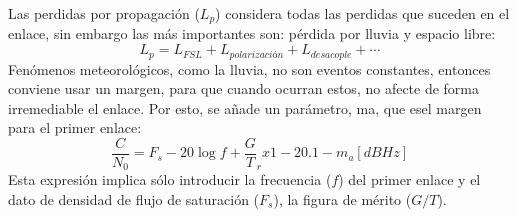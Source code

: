 \documentclass[
	12pt, %
	fleqn, %
	a4paper, %
	oneside, %
]{LegrandOrangeBook}
\begin{document}
Las perdidas por propagación ($L_p$) considera todas las perdidas que suceden en el enlace, sin embargo las más importantes son: pérdida por lluvia y espacio libre:
\begin{equation}
L_p=L_{FSL}+L_{polarización}+L_{desacople}+\cdots
\end{equation}
Fenómenos meteorológicos, como la lluvia, no son eventos constantes, entonces conviene usar un margen, para que cuando ocurran estos, no afecte de forma irremediable el enlace. Por esto, se añade un parámetro, ma, que esel margen para el primer enlace:
\begin{equation}
\frac{C}{N_0}=F_s-20\log f+\frac{G}{T}_rx1-20.1-m_a [dBHz]
\end{equation}
Esta expresión implica sólo introducir la frecuencia ($f$) del primer enlace y el dato de densidad de flujo de saturación ($F_s$), la figura de mérito ($G/T$).
\end{document}
